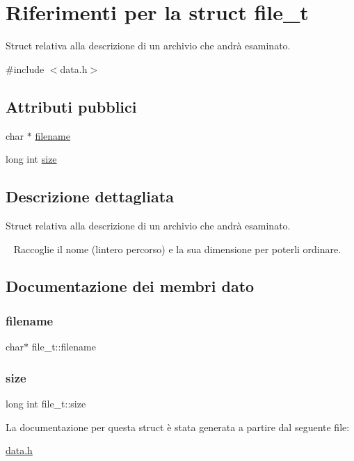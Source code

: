 \hypertarget{structfile__t}{}\section{Riferimenti per la struct file\+\_\+t}
\label{structfile__t}


Struct relativa alla descrizione di un archivio che andrà esaminato.  




{\ttfamily \#include $<$data.\+h$>$}

\subsection*{Attributi pubblici}
\begin{DoxyCompactItemize}
\item 
char $\ast$ \hyperlink{structfile__t_aead43b28cb333d0ee2beebe5f6cdfb41}{filename}
\item 
long int \hyperlink{structfile__t_a778e75e779fa9121918f668f4f452acf}{size}
\end{DoxyCompactItemize}


\subsection{Descrizione dettagliata}
Struct relativa alla descrizione di un archivio che andrà esaminato. 

~\newline
Raccoglie il nome (l\textquotesingle{}intero percorso) e la sua dimensione per poterli ordinare. 

\subsection{Documentazione dei membri dato}
\mbox{\label{structfile__t_aead43b28cb333d0ee2beebe5f6cdfb41}} 
\subsubsection{\texorpdfstring{filename}{filename}}
{\footnotesize\ttfamily char$\ast$ file\+\_\+t\+::filename}

\mbox{\label{structfile__t_a778e75e779fa9121918f668f4f452acf}} 
\subsubsection{\texorpdfstring{size}{size}}
{\footnotesize\ttfamily long int file\+\_\+t\+::size}



La documentazione per questa struct è stata generata a partire dal seguente file\+:\begin{DoxyCompactItemize}
\item 
\hyperlink{data_8h}{data.\+h}\end{DoxyCompactItemize}
